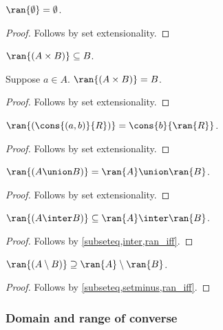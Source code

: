 \begin{proposition}\label{ran_emptyset}
    $\ran{\emptyset} = \emptyset$.
\end{proposition}
\begin{proof}
    Follows by set extensionality.
\end{proof}

\begin{proposition}\label{ran_times}
    $\ran{(A\times B)}\subseteq B$.
\end{proposition}

\begin{proposition}\label{ran_times_inhabited}
    Suppose $a\in A$.
    $\ran{(A\times B)} = B$.
\end{proposition}
\begin{proof}
    Follows by set extensionality.
\end{proof}

\begin{proposition}\label{ran_cons}
    $\ran{(\cons{(a,b)}{R})} = \cons{b}{\ran{R}}$.
\end{proposition}
\begin{proof}
    Follows by set extensionality.
\end{proof}

\begin{proposition}\label{ran_union}
    $\ran{(A\union B)} = \ran{A}\union\ran{B}$.
\end{proposition}
\begin{proof}
    Follows by set extensionality.
\end{proof}

\begin{proposition}\label{ran_inter}
    $\ran{(A\inter B)}\subseteq \ran{A}\inter\ran{B}$.
\end{proposition}
\begin{proof}
    Follows by \cref{subseteq,inter,ran_iff}.
\end{proof}

\begin{proposition}\label{ran_setminus}
    $\ran{(A\setminus B)}\supseteq \ran{A}\setminus\ran{B}$.
\end{proposition}
\begin{proof}
    Follows by \cref{subseteq,setminus,ran_iff}.
\end{proof}

\subsubsection{Domain and range of converse}


